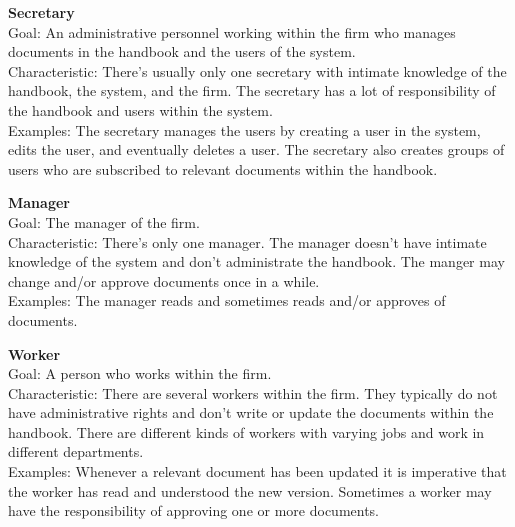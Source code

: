 \textbf{Secretary}
\\
Goal: An administrative personnel working within the firm who manages documents in the handbook and the users of the system.
\\%
Characteristic: There’s usually only one secretary with intimate knowledge of the handbook, the system, and the firm. 
The secretary has a lot of responsibility of the handbook and users within the system.
\\%
Examples: The secretary manages the users by creating a user in the system, edits the user, and eventually deletes a user.
The secretary also creates groups of users who are subscribed to relevant documents within the handbook.

\textbf{Manager}
\\%
Goal: The manager of the firm.
\\
Characteristic: There’s only one manager. The manager doesn’t have intimate knowledge of the system and don’t administrate the handbook.
The manger may change and/or approve documents once in a while.
\\
Examples: The manager reads and sometimes reads and/or approves of documents.

\textbf{Worker}
\\
Goal: A person who works within the firm.
\\%
Characteristic: There are several workers within the firm. 
They typically do not have administrative rights and don’t write or update the documents within the handbook. 
There are different kinds of workers with varying jobs and work in different departments.
\\
Examples: Whenever a relevant document has been updated it is imperative that the worker has read and understood the new version.
Sometimes a worker may have the responsibility of approving one or more documents.

